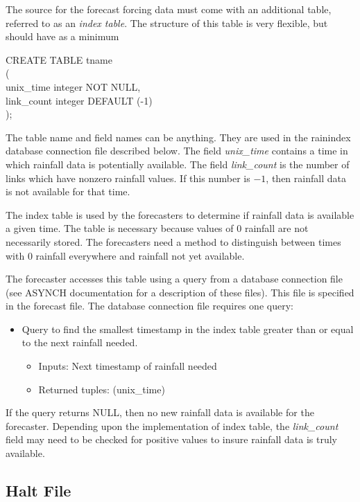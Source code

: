 \documentclass[12pt]{article}
\newenvironment{codeindent}
{\begin{list}{}
        {\setlength{\leftmargin}{.1in}}
        \item[]
}
{\end{list}}
\begin{document}
The source for the forecast forcing data must come with an additional table, referred to as an \emph{index table}. The structure of this table is very flexible, but should have as a minimum
\begin{codeindent}
CREATE TABLE tname \\
( \\
  unix\_time integer NOT NULL, \\
  link\_count integer DEFAULT (-1) \\
);
\end{codeindent}
The table name and field names can be anything. They are used in the rainindex database connection file described below. The field \emph{unix\_time} contains a time in which rainfall data is potentially available. The field \emph{link\_count} is the number of links which have nonzero rainfall values. If this number is $-1$, then rainfall data is not available for that time.

The index table is used by the forecasters to determine if rainfall data is available a given time. The table is necessary because values of 0 rainfall are not necessarily stored. The forecasters need a method to distinguish between times with 0 rainfall everywhere and rainfall not yet available.

The forecaster accesses this table using a query from a database connection file (see ASYNCH documentation for a description of these files). This file is specified in the forecast file. The database connection file requires one query:
\begin{itemize}
 \item Query to find the smallest timestamp in the index table greater than or equal to the next rainfall needed.
  \begin{itemize}
   \item Inputs: Next timestamp of rainfall needed
   \item Returned tuples: (unix\_time)
  \end{itemize}
\end{itemize}
If the query returns NULL, then no new rainfall data is available for the forecaster. Depending upon the implementation of index table, the \emph{link\_count} field may need to be checked for positive values to insure rainfall data is truly available.


\subsection{Halt File} \label{sec: halt file}
\end{document}
